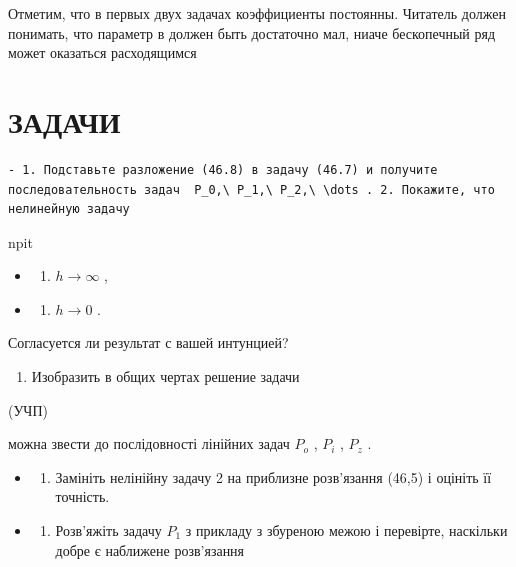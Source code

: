 \documentclass[
  ukrainian,
]{article}
\providecommand{\tightlist}{%
  \setlength{\itemsep}{0pt}\setlength{\parskip}{0pt}}
\begin{document}
Отметим, что в первых двух задачах коэффициенты постоянны. Читатель
должен понимать, что параметр в должен быть достаточно мал, ниаче
бескопечный ряд может оказаться расходящимся

\section{ЗАДАЧИ}\label{ux437ux430ux434ux430ux447ux438-6}

\begin{verbatim}
- 1. Подставьте разложение (46.8) в задачу (46.7) и получите последовательность задач  P_0,\ P_1,\ P_2,\ \dots . 2. Покажите, что нелинейную задачу
\end{verbatim}

npit

\begin{itemize}
\tightlist
\item
  \begin{enumerate}
  \def\labelenumi{\alph{enumi})}
  \tightlist
  \item
    \(h \rightarrow \infty\) ,
  \end{enumerate}
\item
  \begin{enumerate}
  \def\labelenumi{\arabic{enumi})}
  \setcounter{enumi}{5}
  \tightlist
  \item
    \(h \rightarrow 0\) .
  \end{enumerate}
\end{itemize}

Согласуется ли результат с вашей интунцией?

\begin{enumerate}
\def\labelenumi{\arabic{enumi}.}
\setcounter{enumi}{3}
\tightlist
\item
  Изобразить в общих чертах решение задачи
\end{enumerate}

(УЧП)

можна звести до послідовності лінійних задач \(P_{o}\) , \(P_{i}\) ,
\(P_{z}\) .

\begin{itemize}
\tightlist
\item
  \begin{enumerate}
  \def\labelenumi{\arabic{enumi}.}
  \setcounter{enumi}{2}
  \tightlist
  \item
    Замініть нелінійну задачу 2 на приблизне розв'язання (46,5) і
    оцініть її точність.
  \end{enumerate}
\item
  \begin{enumerate}
  \def\labelenumi{\arabic{enumi}.}
  \setcounter{enumi}{3}
  \tightlist
  \item
    Розв'яжіть задачу \(P_1\) з прикладу з збуреною межою і перевірте,
    наскільки добре є наближене розв'язання
  \end{enumerate}
\end{itemize}
\end{document}
